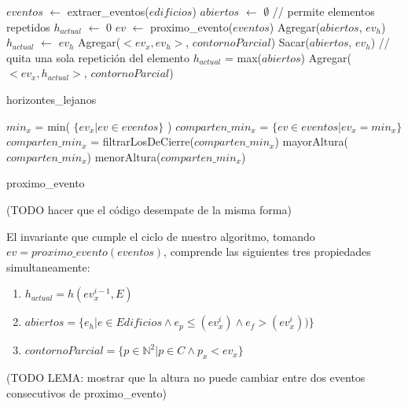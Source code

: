 \begin{algorithm}[H]
\begin{algorithmic}
\STATE $eventos$ $\gets$ extraer\_eventos($edificios$)
\STATE $abiertos$ $\gets$ $\emptyset$			// permite elementos repetidos
\STATE $h_{actual}$ $\gets$ 0
	\STATE $ev$ $\gets$ proximo\_evento($eventos$)
		\STATE Agregar($abiertos$, $ev_h$)
			\STATE $h_{actual}$ $\gets$ $ev_h$
			\STATE Agregar($<ev_x, ev_h>$, $contornoParcial$)
		\ENDIF
	\ELSE
		\STATE Sacar($abiertos$, $ev_h$)			// quita una sola repetición del elemento
			\STATE $h_{actual}$ = max($abiertos$)
			\STATE Agregar($<ev_x, h_{actual}>$, $contornoParcial$)  
		\ENDIF
	\ENDIF
\ENDWHILE
\caption{horizontes\_lejanos}
\end{algorithmic}
\end{algorithm}

\begin{algorithm}[H]
\begin{algorithmic}
	\STATE $min_x$ = min( $\{ ev_x | ev \in eventos\}$ )
	\STATE $comparten\_min_x$ = $\{ ev \in eventos | ev_x = min_x \}$
		\STATE $comparten\_min_x$ = filtrarLosDeCierre($comparten\_min_x$)
		\RETURN mayorAltura($comparten\_min_x$)
	\ELSE
		\RETURN menorAltura($comparten\_min_x$)
	\ENDIF
\caption{proximo\_evento}
\end{algorithmic}
\end{algorithm}

(TODO hacer que el código desempate de la misma forma)

El invariante que cumple el ciclo de nuestro algoritmo, tomando $ev = proximo\_evento(eventos)$, comprende las siguientes
tres propiedades simultaneamente:
\begin{enumerate}
	\item $h_{actual} = h(ev_x^{i-1}, E)$
	\item $abiertos = \{ e_h | e \in Edificios \land e_p \leq (ev_x^i) \land e_f > (ev_x^i) ) \}$
	\item $contornoParcial = \{ p \in \mathbb{N}^2 | p \in C \land p_x < ev_x \}$
\end{enumerate}
(TODO LEMA: mostrar que la altura no puede cambiar entre dos eventos consecutivos de proximo\_evento)


